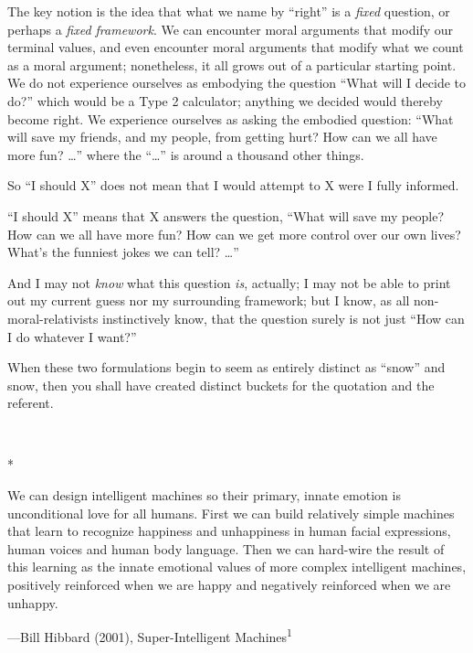 {
 The key notion is the idea that what we name by
``right'' is a \textit{fixed}
question, or perhaps a \textit{fixed framework}. We can encounter moral
arguments that modify our terminal values, and even encounter moral
arguments that modify what we count as a moral argument; nonetheless,
it all grows out of a particular starting point. We do not experience
ourselves as embodying the question ``What will I
decide to do?'' which would be a Type 2 calculator;
anything we decided would thereby become right. We experience ourselves
as asking the embodied question: ``What will save my
friends, and my people, from getting hurt? How can we all have more
fun? \ldots'' where the
``\ldots'' is around a thousand other
things.}

{
 So ``I should X'' does not mean
that I would attempt to X were I fully informed.}

{
 ``I should X'' means that X
answers the question, ``What will save my people? How
can we all have more fun? How can we get more control over our own
lives? What's the funniest jokes we can tell?
\ldots''}

{
 And I may not \textit{know} what this question \textit{is},
actually; I may not be able to print out my current guess nor my
surrounding framework; but I know, as all non-moral-relativists
instinctively know, that the question surely is not just
``How can I do whatever I want?''}

{
 When these two formulations begin to seem as entirely distinct as
``snow'' and snow, then you shall
have created distinct buckets for the quotation and the referent.}

{\centering
 \ ~
\par}

{\centering
 *
\par}


{
 We can design intelligent machines so their primary, innate
emotion is unconditional love for all humans. First we can build
relatively simple machines that learn to recognize happiness and
unhappiness in human facial expressions, human voices and human body
language. Then we can hard-wire the result of this learning as the
innate emotional values of more complex intelligent machines,
positively reinforced when we are happy and negatively reinforced when
we are unhappy.}

{\raggedleft
 {}---Bill Hibbard (2001), Super-Intelligent
Machines\textsuperscript{1}
\par}


